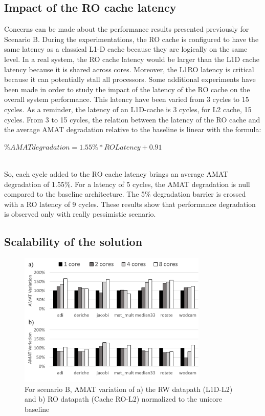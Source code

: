 \documentclass[sigconf]{acmart}
\begin{document}
\subsection{Impact of the RO cache latency}

Concerns can be made about the performance results presented
previously for Scenario B. During the experimentations, the RO cache
is configured to have the same latency as a classical L1-D cache
because they are logically on the same level. In a real system, the RO
cache latency would be larger than the L1D cache latency because it is
shared across cores. Moreover, the L1RO latency is critical because it can potentially stall all
processors. Some additional experiments have been made in
order to study the impact of the latency of the RO cache on the
overall system performance. This latency have been varied from 3
cycles to 15 cycles. As a reminder, the latency of an L1D-cache is 3
cycles, for L2 cache, 15 cycles. From 3 to 15 cycles, the relation
between the latency of the RO cache and the average AMAT degradation
relative to the baseline is linear with the formula:
\centerline{$\%AMATdegradation = 1.55\% * ROLatency +0.91$}\\
So, each cycle added to the RO cache latency brings an average AMAT
degradation of 1.55\%. For a latency of 5 cycles, the AMAT degradation
is null compared to the baseline architecture. The 5\% degradation
barrier is crossed with a RO latency of 9 cycles. These results show
that performance degradation is observed only with really pessimistic
scenario.

\subsection{Scalability of the solution}
\begin{figure}
    \centering
    \includegraphics[width=9cm]{./images/scalabilityAMAT.png}
    \caption{For scenario B, AMAT variation of a) the RW datapath (L1D-L2) and b) RO datapath (Cache RO-L2) normalized to the unicore baseline}
    \label{amatVariation}
\end{figure}
\end{document}
